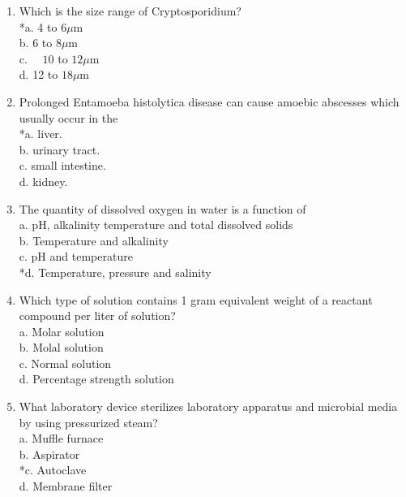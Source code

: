 \begin{enumerate}[1.]
  \item Which is the size range of Cryptosporidium?\\
*a. 4 to $6 \mu \mathrm{m}$\\
b. 6 to $8 \mu \mathrm{m}$\\
c. $\quad 10$ to $12 \mu \mathrm{m}$\\
d. 12 to $18 \mu \mathrm{m}$\\

  \item Prolonged Entamoeba histolytica disease can cause amoebic abscesses which usually occur in the\\
*a. liver.\\
b. urinary tract.\\
c. small intestine.\\
d. kidney.\\

\item The quantity of dissolved oxygen in water is a function of\\
a.	pH, alkalinity temperature and total dissolved solids\\
b.	Temperature and alkalinity\\
c.	pH and temperature\\
*d.	Temperature, pressure and salinity\\

\item Which type of solution contains 1 gram equivalent weight of a reactant compound per liter of solution?\\
a.	Molar solution\\
b.	Molal solution\\
c.	Normal solution\\
d.	Percentage strength solution\\

\item What laboratory device sterilizes laboratory apparatus and microbial media by using pressurized steam?\\
a.	Muffle furnace\\
b.	Aspirator\\
*c.	Autoclave\\
d.	Membrane filter\\

\end{enumerate}



